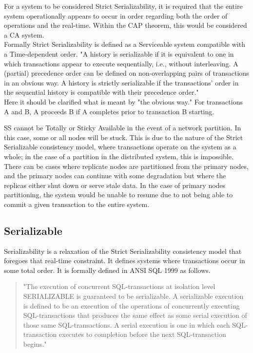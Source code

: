 \documentclass[a4paper,10pt,titlepage]{report}
\begin{document}
For a system to be considered Strict Serializability, it is required that the entire system operationally appears to occur in order regarding both the order of operations and the real-time. Within the CAP theorem, this would be considered a CA system.\\
\vspace{5mm}
Formally Strict Serializability is defined as a Serviceable system compatible with a Time-dependent order.
"A history is serializable if it is equivalent to one in which transactions appear to execute sequentially, i.e., without interleaving. A (partial) precedence order can be defined on non-overlapping pairs of transactions in an obvious way. A history is strictly serializable if the transactions' order in the sequential history is compatible with their precedence order." \cite{Herlihy1990Linearizability}\\
\vspace{5mm}
Here it should be clarified what is meant by "the obvious way." For transactions A and B, A proceeds B if A completes prior to transaction B starting.

SS cannot be Totally or Sticky Available in the event of a network partition. In this case, some or all nodes will be stuck. This is due to the nature of the Strict Serializable consistency model, where transactions operate on the system as a whole; in the case of a partition in the distributed system, this is impossible. There can be cases where replicate nodes are partitioned from the primary nodes, and the primary nodes can continue with some degradation but where the replicas either shut down or serve stale data. In the case of primary nodes partitioning, the system would be unable to resume due to not being able to commit a given transaction to the entire system.\\
\vspace{2mm}




\subsection{Serializable}

Serializability is a relaxation of the Strict Serializability consistency model that foregoes that real-time constraint. It defines systems where transactions occur in some total order. It is formally defined in ANSI SQL 1999\cite{ansisql1999} as follows.

\begin{quote}
"The execution of concurrent SQL-transactions at isolation level SERIALIZABLE is guaranteed to be serializable. A serializable execution is defined to be an execution of the operations of concurrently executing SQL-transactions that produces the same effect as some serial execution of those same SQL-transactions. A serial execution is one in which each SQL-transaction executes to completion before the next SQL-transaction begins."\cite{ansisql1999}\\
\end{quote}
\vspace{5mm}
\end{document}
